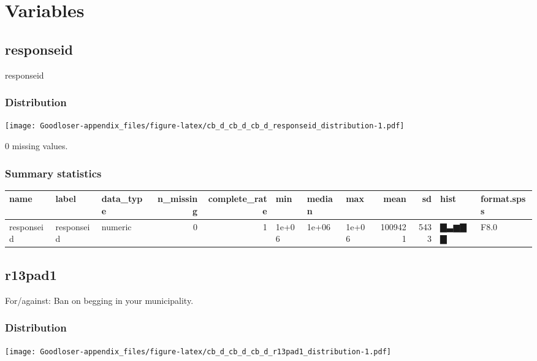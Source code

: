 \documentclass[
]{book}
\begin{document}
\hypertarget{variables-2}{%
\section{Variables}\label{variables-2}}

\hypertarget{responseid}{%
\subsection{responseid}\label{responseid}}

responseid

\hypertarget{responseid_distribution}{%
\subsubsection{Distribution}\label{responseid_distribution}}

\texttt{[image: Goodloser-appendix\_files/figure-latex/cb\_d\_cb\_d\_cb\_d\_responseid\_distribution-1.pdf]}

0 missing values.

\hypertarget{responseid_summary}{%
\subsubsection{Summary statistics}\label{responseid_summary}}

\begin{tabular}{l|l|l|r|r|l|l|l|r|r|l|l}
\hline
name & label & data_type & n_missing & complete_rate & min & median & max & mean & sd & hist & format.spss\\
\hline
responseid & responseid & numeric & 0 & 1 & 1e+06 & 1e+06 & 1e+06 & 1009421 & 5433 & ▇▃▆▇▇ & F8.0\\
\hline
\end{tabular}

\hypertarget{r13pad1}{%
\subsection{r13pad1}\label{r13pad1}}

For/against: Ban on begging in your municipality.

\hypertarget{r13pad1_distribution}{%
\subsubsection{Distribution}\label{r13pad1_distribution}}

\texttt{[image: Goodloser-appendix\_files/figure-latex/cb\_d\_cb\_d\_cb\_d\_r13pad1\_distribution-1.pdf]}
\end{document}
